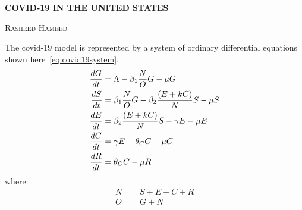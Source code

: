 \documentclass{amsart}
\makeatletter
\newcommand{\authorfootnotes}{\renewcommand\thefootnote{\@fnsymbol\c@footnote}}%
\makeatother
\begin{document}
\begin{center}

\begin{large} %
\uppercase{\textbf{COVID-19 IN THE UNITED STATES}}
\end{large}

\vspace{5mm}

\normalsize
\authorfootnotes
\textsc{
Rasheed Hameed
}

\vspace{3mm}

\begin{small}
\vspace{1mm}
\end{small}
\end{center}



\par
The covid-19 model is represented by a system of ordinary differential equations shown here~\ref{eq:covid19system}.
\begin{align}\label{eq:covid19system} 
	\frac{dG}{dt}& = \Lambda - \beta_1 \frac{N}{O}G - \mu G \\
	\frac{dS}{dt}& = \beta_1 \frac{N}{O} G
					 - \beta_2 \frac{(E+kC)}{N} S
					 - \mu S \notag \\
	\frac{dE}{dt}& = \beta_2 \frac{(E+kC)}{N} S
					- \gamma E
					- \mu E \notag \\
	\frac{dC}{dt}& = \gamma E
 					-\theta_C C
					- \mu C \notag \\
	\frac{dR}{dt}& = 	 \theta_C C
					- \mu R \notag
\end{align}
where:
\begin{align*}
	N& = S+E+C+R \\
	O& = G + N
\end{align*}
\par
\end{document}
